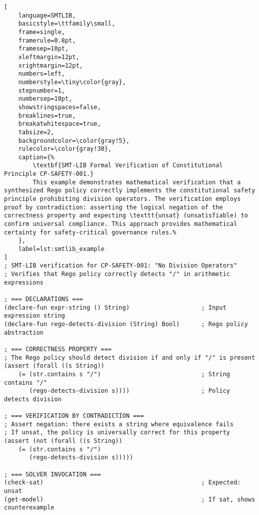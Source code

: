 \documentclass[manuscript,screen,9pt]{acmart}
\begin{document}
\begin{lstlisting}[
    language=SMTLIB,
    basicstyle=\ttfamily\small,
    frame=single,
    framerule=0.8pt,
    framesep=10pt,
    xleftmargin=12pt,
    xrightmargin=12pt,
    numbers=left,
    numberstyle=\tiny\color{gray},
    stepnumber=1,
    numbersep=10pt,
    showstringspaces=false,
    breaklines=true,
    breakatwhitespace=true,
    tabsize=2,
    backgroundcolor=\color{gray!5},
    rulecolor=\color{gray!30},
    caption={%
        \textbf{SMT-LIB Formal Verification of Constitutional Principle CP-SAFETY-001.}
        This example demonstrates mathematical verification that a synthesized Rego policy correctly implements the constitutional safety principle prohibiting division operators. The verification employs proof by contradiction: asserting the logical negation of the correctness property and expecting \texttt{unsat} (unsatisfiable) to confirm universal compliance. This approach provides mathematical certainty for safety-critical governance rules.%
    },
    label=lst:smtlib_example
]
; SMT-LIB verification for CP-SAFETY-001: "No Division Operators"
; Verifies that Rego policy correctly detects "/" in arithmetic expressions

; === DECLARATIONS ===
(declare-fun expr-string () String)                    ; Input expression string
(declare-fun rego-detects-division (String) Bool)      ; Rego policy abstraction

; === CORRECTNESS PROPERTY ===
; The Rego policy should detect division if and only if "/" is present
(assert (forall ((s String))
    (= (str.contains s "/")                            ; String contains "/"
       (rego-detects-division s))))                    ; Policy detects division

; === VERIFICATION BY CONTRADICTION ===
; Assert negation: there exists a string where equivalence fails
; If unsat, the policy is universally correct for this property
(assert (not (forall ((s String))
    (= (str.contains s "/")
       (rego-detects-division s)))))

; === SOLVER INVOCATION ===
(check-sat)                                            ; Expected: unsat
(get-model)                                            ; If sat, shows counterexample
\end{lstlisting}
\end{document}
